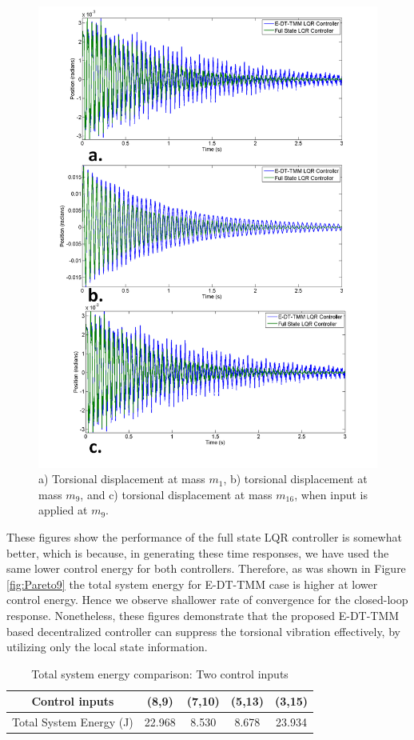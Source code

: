 \documentclass[11pt]{ucthesis}
\begin{document}
\begin{figure}[thpb]
\centering
\includegraphics[width=.75\linewidth]{Figures/Position.png}
\caption{a) Torsional displacement at mass $m_1$, b) torsional displacement at mass $m_9$, and c) torsional displacement at mass $m_{16}$, when input is applied at $m_9$.}
\label{time_m_1}
\end{figure}

These figures show the performance of the full state LQR controller is somewhat better, which is because, in generating these time responses, we have used the same lower control energy for both controllers. Therefore, as was shown in Figure \ref{fig:Pareto9} the total system energy for E-DT-TMM case is higher at lower control energy. Hence we observe shallower rate of convergence for the closed-loop response. Nonetheless, these figures demonstrate that the proposed E-DT-TMM based decentralized controller can suppress the torsional vibration effectively, by utilizing only the local state information.

\begin{table}
\begin{center}
\caption{Total system energy comparison: Two control inputs}
\label{t:twoinputs}
\begin{tabular}{|c||c|c|c|c|}
\hline
Control inputs & (8,9) & (7,10) & (5,13) & (3,15) \\
\hline
Total System Energy (J) & 22.968 & 8.530 & 8.678 & 23.934 \\ 
\hline
\end{tabular}
\end{center}
\end{table}
\end{document}
